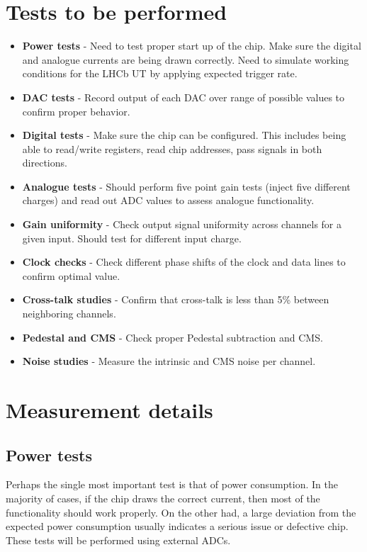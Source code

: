 \documentclass{lhcbnote}
\begin{document}
\section{Tests to be performed}

\begin{itemize}
\item \textbf{Power tests} - Need to test proper start up of the chip. Make sure the digital and analogue currents are being drawn correctly. Need to simulate working conditions for the LHCb UT by applying expected trigger rate.
\item \textbf{DAC tests} - Record output of each DAC over range of possible values to confirm proper behavior.
\item \textbf{Digital tests} - Make sure the chip can be configured. This includes being able to read/write registers, read chip addresses, pass signals in both directions.
\item \textbf{Analogue tests} - Should perform five point gain tests (inject five different charges) and read out ADC values to assess analogue functionality.
\item \textbf{Gain uniformity} - Check output signal uniformity across channels for a given input. Should test for different input charge.
\item \textbf{Clock checks} - Check different phase shifts of the clock and data lines to confirm optimal value.
\item \textbf{Cross-talk studies} - Confirm that cross-talk is less than 5\% between neighboring channels.
\item \textbf{Pedestal and CMS} - Check proper Pedestal subtraction and CMS.
\item \textbf{Noise studies} - Measure the intrinsic and CMS noise per channel.
\end{itemize}

\section{Measurement details}

\subsection{Power tests}

Perhaps the single most important test is that of power consumption. In the majority of cases, if the chip draws the correct current, then most of the functionality should work properly. On the other had, a large deviation from the expected power consumption usually indicates a serious issue or defective chip. These tests will be performed using external ADCs.
\end{document}
